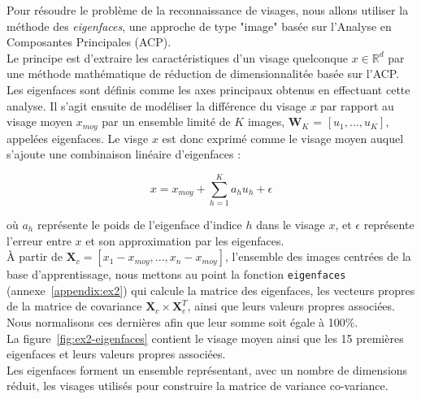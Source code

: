 \documentclass[a4paper]{article}
\newcommand{\figref}[1]{figure~\ref{#1}}
\newcommand{\annexeref}[1]{annexe~\ref{#1}}
\begin{document}
Pour résoudre le problème de la reconnaissance de visages, nous allons utiliser
la méthode des \textit{eigenfaces}, une approche de type "image" basée sur
l'Analyse en Composantes Principales (ACP).\\

Le principe est d'extraire les caractéristiques d'un visage quelconque
$\mathit{x} \in \mathbb{R}^d$ par une méthode mathématique de réduction de
dimensionnalitée basée sur l'ACP. Les eigenfaces sont définis comme les axes
principaux obtenus en effectuant cette analyse. Il s'agit ensuite de modéliser
la différence du visage $\mathit{x}$ par rapport au visage moyen
$\mathit{x}_{moy}$ par un ensemble limité de $\mathit{K}$ images, $\mathbf{W}_K$
= $[u_1,...,\mathit{u_K}]$, appelées eigenfaces. Le visge $\mathit{x}$ est donc
exprimé comme le visage moyen auquel s'ajoute une combinaison linéaire
d'eigenfaces : 

$$ \mathit{x} = \mathit{x}_{moy} + \sum_{h=1}^{\mathit{K}} a_h u_h + \epsilon$$

où $a_h$ représente le poids de l'eigenface d'indice $h$ dans le visage
$\mathit{x}$, et $\epsilon$ représente l'erreur entre $\mathit{x}$ et son approximation
par les eigenfaces. \\

À partir de $\textbf{X}_c = [x_1 - x_{moy}, ..., x_n - x_{moy}]$, l'ensemble des
images centrées de la base d'apprentissage, nous mettons au point la fonction
\texttt{eigenfaces} (\annexeref{appendix:ex2}) qui calcule la matrice des
eigenfaces, les vecteurs propres de la matrice de covariance $\textbf{X}_c
\times \textbf{X}_c^T$, ainsi que leurs valeurs propres associées. Nous
normalisons ces dernières afin que leur somme soit égale à 100\%. \\

La \figref{fig:ex2-eigenfaces} contient le visage moyen ainsi que les 15
premières eigenfaces et leurs valeurs propres associées. \\

Les eigenfaces forment un ensemble représentant, avec un nombre de dimensions
réduit, les visages utilisés pour construire la matrice de variance co-variance. 
\end{document}
